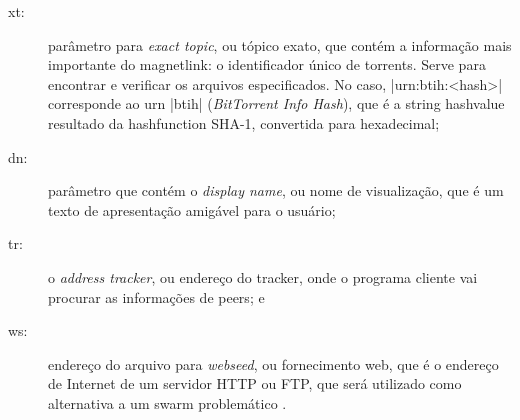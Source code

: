 \begin{description}
    \item[xt:] parâmetro para \emph{exact topic}, ou tópico exato, que contém a
        informação mais importante do \gls*{magnetlink}: o identificador único de
        \glspl*{torrent}. Serve para encontrar e verificar os arquivos especificados.
        No caso, \bverb|urn:btih:<hash>| corresponde ao \gls{urn} \sverb|btih|
        (\emph{BitTorrent Info Hash}), que é a \gls*{string} \gls{hashvalue} resultado
        da \gls{hashfunction} SHA-1, convertida para hexadecimal;

    \item[dn:] parâmetro que contém o \emph{display name}, ou nome de visualização, que
        é um texto de apresentação amigável para o usuário;

    \item[tr:] o \emph{address tracker}, ou endereço do \gls*{tracker}, onde o programa
        cliente vai procurar as informações de \glspl*{peer}; e

    \item[ws:] endereço do arquivo para \emph{webseed}, ou fornecimento web,
        que é o endereço de Internet de um servidor HTTP ou FTP, que será utilizado como
        alternativa a um \gls*{swarm} problemático \cite{wiki:torrent}.
\end{description}